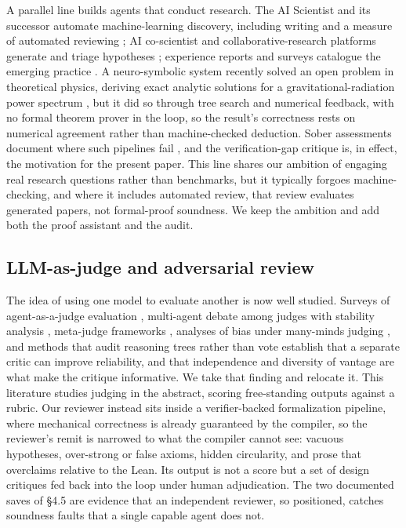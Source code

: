 \documentclass[11pt]{article}
\begin{document}
A parallel line builds agents that conduct research. The AI Scientist and its successor automate
machine-learning discovery, including writing and a measure of automated reviewing \cite{r1,r2};
AI co-scientist and collaborative-research platforms generate and triage hypotheses \cite{r3}; experience
reports and surveys catalogue the emerging practice \cite{r17,r18}. A neuro-symbolic system recently
solved an open problem in theoretical physics, deriving exact analytic solutions for a
gravitational-radiation power spectrum \cite{r4}, but it did so through tree search and numerical
feedback, with no formal theorem prover in the loop, so the result's correctness rests on numerical
agreement rather than machine-checked deduction. Sober assessments document where such pipelines
fail \cite{r7}, and the verification-gap critique \cite{r6} is, in effect, the motivation for the present paper.
This line shares our ambition of engaging real research questions rather than benchmarks, but it
typically forgoes machine-checking, and where it includes automated review, that review evaluates
generated papers, not formal-proof soundness. We keep the ambition and add both the proof assistant
and the audit.

\subsection{LLM-as-judge and adversarial review}

The idea of using one model to evaluate another is now well studied. Surveys of agent-as-a-judge
evaluation \cite{r19}, multi-agent debate among judges with stability analysis \cite{r20}, meta-judge
frameworks \cite{r21}, analyses of bias under many-minds judging \cite{r22}, and methods that audit reasoning
trees rather than vote \cite{r23} establish that a separate critic can improve reliability, and that
independence and diversity of vantage are what make the critique informative. We take that finding
and relocate it. This literature studies judging in the abstract, scoring free-standing outputs
against a rubric. Our reviewer instead sits inside a verifier-backed formalization pipeline, where
mechanical correctness is already guaranteed by the compiler, so the reviewer's remit is narrowed
to what the compiler cannot see: vacuous hypotheses, over-strong or false axioms, hidden
circularity, and prose that overclaims relative to the Lean. Its output is not a score but a set of
design critiques fed back into the loop under human adjudication. The two documented saves of §4.5
are evidence that an independent reviewer, so positioned, catches soundness faults that a single
capable agent does not.
\end{document}

